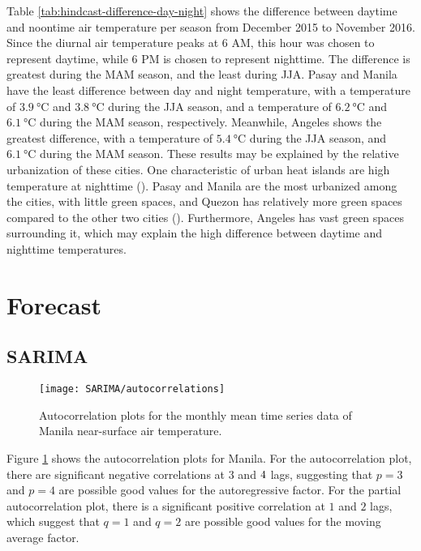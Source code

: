 		Table \ref{tab:hindcast-difference-day-night} shows the difference between daytime and noontime air temperature per season from December 2015 to November 2016.
		Since the diurnal air temperature peaks at 6 AM, this hour was chosen to represent daytime, while 6 PM is chosen to represent nighttime.
		The difference is greatest during the MAM season, and the least during JJA.
		Pasay and Manila have the least difference between day and night temperature,
			with a temperature of $\qty{3.9}{\degreeCelsius}$ and $\qty{3.8}{\degreeCelsius}$ during the JJA season,
			and a temperature of $\qty{6.2}{\degreeCelsius}$ and $\qty{6.1}{\degreeCelsius}$ during the MAM season,
			respectively.
		Meanwhile, Angeles shows the greatest difference, with a temperature of $\qty{5.4}{\degreeCelsius}$ during the JJA season, and $\qty{6.1}{\degreeCelsius}$ during the MAM season.
		These results may be explained by the relative urbanization of these cities.
		One characteristic of urban heat islands are high temperature at nighttime (\cite{Oke2017urban}).
		Pasay and Manila are the most urbanized among the cities, with little green spaces,
			and Quezon has relatively more green spaces compared to the other two cities (\cite{Bilang2022}).
		Furthermore, Angeles has vast green spaces surrounding it, which may explain the high difference between daytime and nighttime temperatures.
	
\section{Forecast}
	\subsection{SARIMA}
				
		\begin{figure}
			\centering
			\texttt{[image: SARIMA/autocorrelations]}
			\caption{
				Autocorrelation plots for the monthly mean time series data of Manila near-surface air temperature.
			}
			\label{fig:sarima-autocorrelations}
		\end{figure}	
		
		Figure \ref{fig:sarima-autocorrelations} shows the autocorrelation plots for Manila.
		For the autocorrelation plot, 
			there are significant negative correlations at $\num{3}$ and $\num4$ lags,
			suggesting that $p = 3$ and $p = 4$ are possible good values for the autoregressive factor.
		For the partial autocorrelation plot,
			there is a significant positive correlation at $\num{1}$ and $\num{2}$ lags,
			which suggest that $q = 1$ and $q = 2$ are possible good values for the moving average factor.
		
